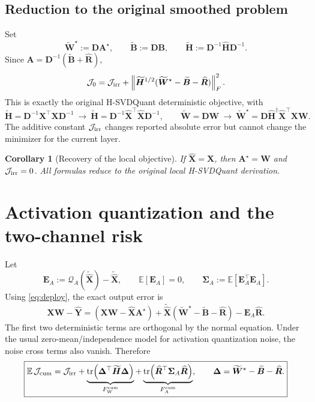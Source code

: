 \documentclass[11pt]{article}
\newtheorem{corollary}{Corollary}
\newcommand{\X}{\bm X}
\newcommand{\Xh}{\widehat{\bm X}}
\newcommand{\W}{\bm W}
\newcommand{\Y}{\bm Y}
\newcommand{\D}{\bm D}
\newcommand{\B}{\bm B}
\newcommand{\Rh}{\widehat{\bm R}}
\newcommand{\Hh}{\widehat{\bm H}}
\newcommand{\Ht}{\widetilde{\bm H}}
\newcommand{\SigA}{\bm\Sigma_A}
\newcommand{\Qa}{\mathcal Q_A}
\newcommand{\tr}{\operatorname{tr}}
\begin{document}
\subsection{Reduction to the original smoothed problem}

Set
\begin{equation}\label{eq:smoothed-target}
  \widetilde{\W}^{\star}:=\D\bm A^\star,
  \qquad \widetilde{\B}:=\D\B,
  \qquad \Ht:=\D^{-1}\Hh\D^{-1}.
\end{equation}
Since $\bm A=\D^{-1}(\widetilde{\B}+\Rh)$,
\begin{equation}\label{eq:standardform}
  \mathcal J_0
  =\mathcal J_{\rm irr}
  +\left\|\Ht^{1/2}
    (\widetilde{\W}^{\star}-\widetilde{\B}-\Rh)\right\|_F^2.
\end{equation}
This is exactly the original H-SVDQuant deterministic objective, with
\begin{equation}\label{eq:substitution}
  \boxed{
  \widetilde{\bm H}=\D^{-1}\X^\top\X\D^{-1}
  \ \longrightarrow\ 
  \Ht=\D^{-1}\Xh^\top\Xh\D^{-1},
  \qquad
  \widetilde{\W}=\D\W
  \ \longrightarrow\ 
  \widetilde{\W}^{\star}=\D\Hh^\dagger\Xh^\top\X\W .}
\end{equation}
The additive constant $\mathcal J_{\rm irr}$ changes reported absolute error
but cannot change the minimizer for the current layer.

\begin{corollary}[Recovery of the local objective]
If $\Xh=\X$, then $\bm A^\star=\W$ and $\mathcal J_{\rm irr}=0$.  All formulas
reduce to the original local H-SVDQuant derivation.
\end{corollary}

\section{Activation quantization and the two-channel risk}

Let
\[
  \bm E_A:=\Qa(\widetilde{\Xh})-\widetilde{\Xh},
  \qquad \mathbb E[\bm E_A]=0,
  \qquad \SigA:=\mathbb E[\bm E_A^\top\bm E_A].
\]
Using \eqref{eq:deploy}, the exact output error is
\[
  \X\W-\widehat{\Y}
  =\left(\X\W-\Xh\bm A^\star\right)
   +\widetilde{\Xh}
    (\widetilde{\W}^{\star}-\widetilde{\B}-\Rh)
   -\bm E_A\Rh.
\]
The first two deterministic terms are orthogonal by the normal equation.
Under the usual zero-mean/independence model for activation quantization noise,
the noise cross terms also vanish.  Therefore
\begin{equation}\label{eq:twochannel}
  \boxed{
  \mathbb E\,\mathcal J_{\mathrm{cum}}
  =\mathcal J_{\rm irr}
   +\underbrace{\tr\!\left(\bm\Delta^\top\Ht\bm\Delta\right)}_{F_W^{\rm cum}}
   +\underbrace{\tr\!\left(\Rh^\top\SigA\Rh\right)}_{F_A^{\rm cum}},
  \qquad
  \bm\Delta=\widetilde{\W}^{\star}-\widetilde{\B}-\Rh .}
\end{equation}
\end{document}
